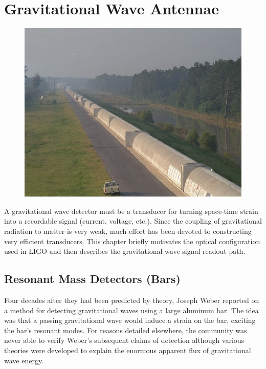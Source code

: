 \chapter{Gravitational Wave Antennae}
\label{chap:IFO}

\begin{figure}[!h]
\centerline{\includegraphics[angle=0,width=6.5in]{Figures/Chap2/BeamTube2b.jpg}}
\end{figure}
\clearpage

A gravitational wave detector must be a transducer for turning space-time strain 
into a recordable signal (current, voltage, etc.). Since the coupling of gravitational
radiation to matter is very weak, much effort has been devoted to constructing
very efficient transducers. This chapter briefly motivates the optical
configuration used in LIGO and then describes the gravitational wave signal readout path.



\section{Resonant Mass Detectors (Bars)}

Four decades after they had been predicted by theory, Joseph Weber reported 
on a method for detecting gravitational waves using a large aluminum bar\cite{Weber:1960}. 
The idea was that a passing gravitational wave
would induce a strain on the bar, exciting the bar's resonant modes. 
For reasons detailed elsewhere\cite{Levine:Bar,Tyson:Bar}, the
community was never able to verify Weber's subsequent claims of 
detection\cite{Weber:1969}
although various theories\cite{Misner:beaming,Hawking:Bursts} were developed 
to explain the enormous apparent flux of gravitational wave energy.

